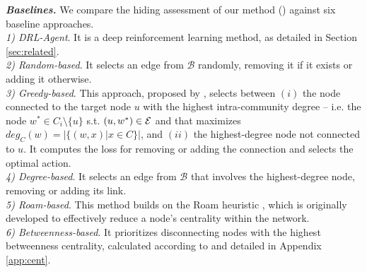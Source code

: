 
\textbf{\textit{Baselines.}} We compare the hiding assessment of our method (\method{}) against six baseline approaches.\\
\noindent \textit{1) DRL-Agent}. It is a deep reinforcement learning method, as detailed in Section \ref{sec:related}. \\
\noindent \textit{2) Random-based}. It selects an edge from $\mathcal{B}$ randomly, removing it if it exists or adding it otherwise. \\
\noindent \textit{3) Greedy-based}. This approach, proposed by \citet{bernini2024kdd}, selects between $(i)$ the node connected to the target node $u$ with the highest intra-community degree -- i.e. the node $w^* \in C_i\setminus\{u\}$ s.t. $(u,w^*) \in \mathcal{E}$ and that maximizes $deg_C(w) = |\{(w,x)|x\in C\}|$, and $(ii)$ the  highest-degree node not connected to $u$. It computes the loss for removing or adding the connection and selects the optimal action.\\
\noindent \textit{4) Degree-based}. It selects an edge from $ \mathcal{B} $ that involves the highest-degree node, removing or adding its link. \\
\noindent \textit{5) Roam-based}. This method builds on the Roam heuristic \cite{deception_modularity_2}, which is originally developed to effectively reduce a node’s centrality within the network.\\
\noindent \textit{6) Betweenness-based}. It prioritizes disconnecting nodes with the highest betweenness centrality, calculated according to \citet{freeman1977betweenness} and detailed in Appendix \ref{app:cent}. 


